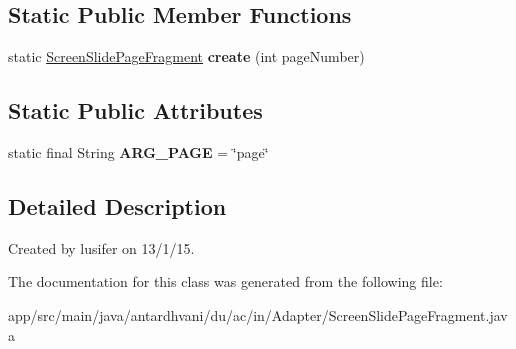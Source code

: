 \subsection*{Static Public Member Functions}
\begin{DoxyCompactItemize}
\item 
\hypertarget{classantardhvani_1_1du_1_1ac_1_1in_1_1_adapter_1_1_screen_slide_page_fragment_ad30fb6031afe69b939788b28c77a5171}{}static \hyperlink{classantardhvani_1_1du_1_1ac_1_1in_1_1_adapter_1_1_screen_slide_page_fragment}{Screen\+Slide\+Page\+Fragment} {\bfseries create} (int page\+Number)\label{classantardhvani_1_1du_1_1ac_1_1in_1_1_adapter_1_1_screen_slide_page_fragment_ad30fb6031afe69b939788b28c77a5171}

\end{DoxyCompactItemize}
\subsection*{Static Public Attributes}
\begin{DoxyCompactItemize}
\item 
\hypertarget{classantardhvani_1_1du_1_1ac_1_1in_1_1_adapter_1_1_screen_slide_page_fragment_a44f917e021074e0b80df7b16c0ef3ec6}{}static final String {\bfseries A\+R\+G\+\_\+\+P\+A\+G\+E} = \char`\"{}page\char`\"{}\label{classantardhvani_1_1du_1_1ac_1_1in_1_1_adapter_1_1_screen_slide_page_fragment_a44f917e021074e0b80df7b16c0ef3ec6}

\end{DoxyCompactItemize}


\subsection{Detailed Description}
Created by lusifer on 13/1/15. 

The documentation for this class was generated from the following file\+:\begin{DoxyCompactItemize}
\item 
app/src/main/java/antardhvani/du/ac/in/\+Adapter/Screen\+Slide\+Page\+Fragment.\+java\end{DoxyCompactItemize}
